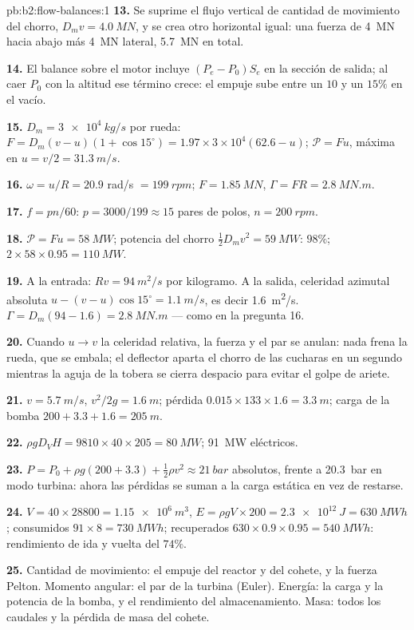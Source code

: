 \begin{solution}{pb:b2:flow-balances:1}
\textbf{13.} Se suprime el flujo vertical de cantidad de movimiento del
chorro, $D_mv = \qty{4.0}{MN}$, y se crea otro horizontal igual: una fuerza
de \qty{4}{MN} hacia abajo más \qty{4}{MN} lateral, \qty{5.7}{MN} en total.

\textbf{14.} El balance sobre el motor incluye $(P_e - P_0)S_e$ en la
sección de salida; al caer $P_0$ con la altitud ese término crece: el
empuje sube entre un $10$ y un $15\%$ en el vacío.

\textbf{15.} $D_m = \qty{3e4}{kg/s}$ por rueda: $F = D_m(v - u)(1 + \cos15^\circ) =
1.97 \times 3 \times 10^4(62.6 - u)$; $\mathcal P = Fu$, máxima en $u = v/2 = \qty{31.3}{m/s}$.

\textbf{16.} $\omega = u/R = 20.9$ rad/s $= \qty{199}{rpm}$; $F = \qty{1.85}{MN}$, $\Gamma = FR
= \qty{2.8}{MN.m}$.

\textbf{17.} $f = pn/60$: $p = 3000/199 \approx 15$ pares de polos, $n = \qty{200}{rpm}$.

\textbf{18.} $\mathcal P = Fu = \qty{58}{MW}$; potencia del chorro $\tfrac12D_mv^2 = \qty{59}{MW}$:
$98\%$; $2 \times 58 \times 0.95 = \qty{110}{MW}$.

\textbf{19.} A la entrada: $Rv = \qty{94}{m^2/s}$ por kilogramo. A la salida, celeridad azimutal absoluta
$u - (v - u)\cos15^\circ = \qty{1.1}{m/s}$, es decir \qty{1.6}{m^2/s}. $\Gamma = D_m(94 -
1.6) = \qty{2.8}{MN.m}$ --- como en la pregunta 16.

\textbf{20.} Cuando $u \to v$ la celeridad relativa, la fuerza y el par se
anulan: nada frena la rueda, que se embala; el deflector aparta el chorro
de las cucharas en un segundo mientras la aguja de la tobera se cierra
despacio para evitar el golpe de ariete.

\textbf{21.} $v = \qty{5.7}{m/s}$, $v^2/2g = \qty{1.6}{m}$; pérdida $0.015 \times 133 \times 1.6 =
\qty{3.3}{m}$; carga de la bomba $200 + 3.3 + 1.6 = \qty{205}{m}$.

\textbf{22.} $\rho gD_VH = 9810 \times 40 \times 205 = \qty{80}{MW}$; \qty{91}{MW} eléctricos.

\textbf{23.} $P = P_0 + \rho g(200 + 3.3) + \tfrac12\rho v^2 \approx \qty{21}{bar}$ absolutos,
frente a \qty{20.3}{bar} en modo turbina: ahora las pérdidas se suman a la
carga estática en vez de restarse.

\textbf{24.} $V = 40 \times 28800 = \qty{1.15e6}{m^3}$, $E = \rho gV \times 200 = \qty{2.3e12}{J}
= \qty{630}{MWh}$; consumidos $91 \times 8 = \qty{730}{MWh}$; recuperados $630 \times 0.9 \times
0.95 = \qty{540}{MWh}$: rendimiento de ida y vuelta del $74\%$.

\textbf{25.} Cantidad de movimiento: el empuje del reactor y del cohete, y
la fuerza Pelton. Momento angular: el par de la turbina (Euler). Energía:
la carga y la potencia de la bomba, y el rendimiento del almacenamiento.
Masa: todos los caudales y la pérdida de masa del cohete.
\end{solution}
